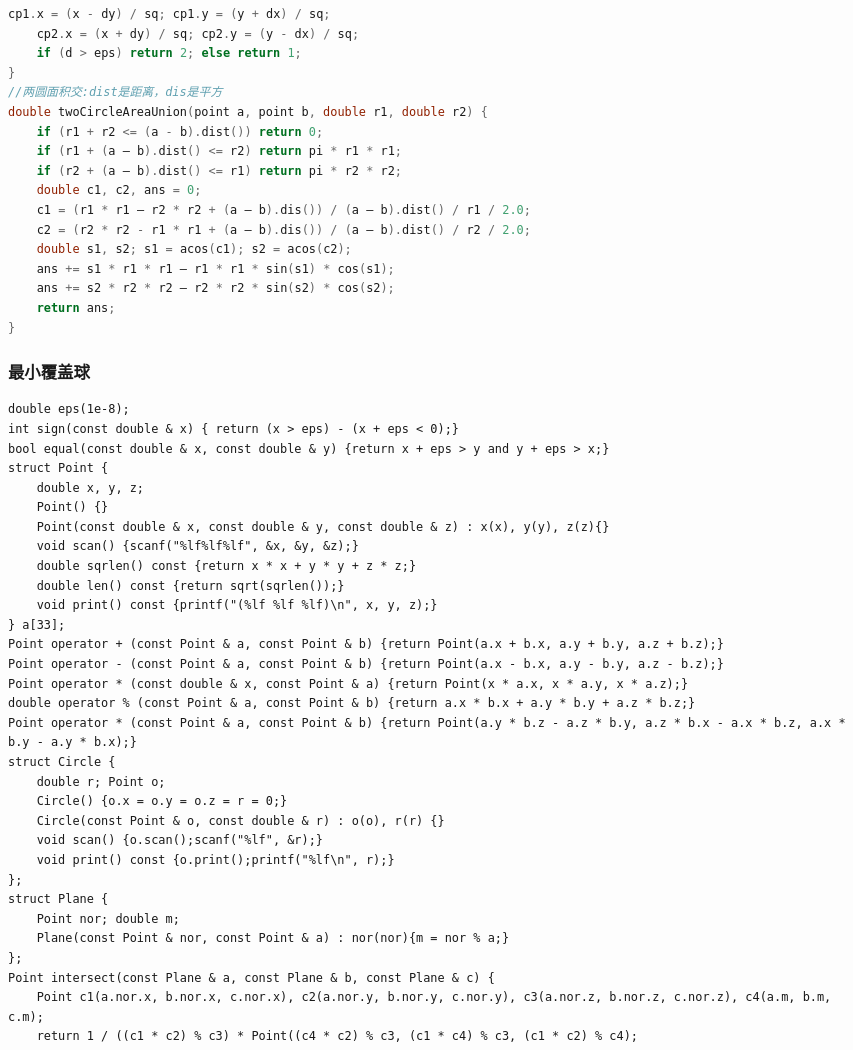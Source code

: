 \documentclass[landscape,a4paper]{article}
\begin{document}
\begin{spacing}{0.3}
\begin{multicols}{2}
\begin{lstlisting}[language=C++]
	cp1.x = (x - dy) / sq; cp1.y = (y + dx) / sq;
	cp2.x = (x + dy) / sq; cp2.y = (y - dx) / sq;
	if (d > eps) return 2; else return 1;
}
//两圆面积交:dist是距离，dis是平方
double twoCircleAreaUnion(point a, point b, double r1, double r2) {
	if (r1 + r2 <= (a - b).dist()) return 0;
	if (r1 + (a – b).dist() <= r2) return pi * r1 * r1;
	if (r2 + (a – b).dist() <= r1) return pi * r2 * r2;
	double c1, c2, ans = 0;
	c1 = (r1 * r1 – r2 * r2 + (a – b).dis()) / (a – b).dist() / r1 / 2.0;
	c2 = (r2 * r2 - r1 * r1 + (a – b).dis()) / (a – b).dist() / r2 / 2.0;
	double s1, s2; s1 = acos(c1); s2 = acos(c2);
	ans += s1 * r1 * r1 – r1 * r1 * sin(s1) * cos(s1);
	ans += s2 * r2 * r2 – r2 * r2 * sin(s2) * cos(s2);
	return ans;
}
\end{lstlisting}
\subsubsection{最小覆盖球}
\begin{lstlisting}
double eps(1e-8);
int sign(const double & x) { return (x > eps) - (x + eps < 0);}
bool equal(const double & x, const double & y) {return x + eps > y and y + eps > x;}
struct Point {
	double x, y, z;
	Point() {}
	Point(const double & x, const double & y, const double & z) : x(x), y(y), z(z){}
	void scan() {scanf("%lf%lf%lf", &x, &y, &z);}
	double sqrlen() const {return x * x + y * y + z * z;}
	double len() const {return sqrt(sqrlen());}
	void print() const {printf("(%lf %lf %lf)\n", x, y, z);}
} a[33];
Point operator + (const Point & a, const Point & b) {return Point(a.x + b.x, a.y + b.y, a.z + b.z);}
Point operator - (const Point & a, const Point & b) {return Point(a.x - b.x, a.y - b.y, a.z - b.z);}
Point operator * (const double & x, const Point & a) {return Point(x * a.x, x * a.y, x * a.z);}
double operator % (const Point & a, const Point & b) {return a.x * b.x + a.y * b.y + a.z * b.z;}
Point operator * (const Point & a, const Point & b) {return Point(a.y * b.z - a.z * b.y, a.z * b.x - a.x * b.z, a.x * b.y - a.y * b.x);}
struct Circle {
	double r; Point o;
	Circle() {o.x = o.y = o.z = r = 0;}
	Circle(const Point & o, const double & r) : o(o), r(r) {}
	void scan() {o.scan();scanf("%lf", &r);}
	void print() const {o.print();printf("%lf\n", r);}
};
struct Plane {
	Point nor; double m;
	Plane(const Point & nor, const Point & a) : nor(nor){m = nor % a;}
};
Point intersect(const Plane & a, const Plane & b, const Plane & c) {
	Point c1(a.nor.x, b.nor.x, c.nor.x), c2(a.nor.y, b.nor.y, c.nor.y), c3(a.nor.z, b.nor.z, c.nor.z), c4(a.m, b.m, c.m);
	return 1 / ((c1 * c2) % c3) * Point((c4 * c2) % c3, (c1 * c4) % c3, (c1 * c2) % c4);

\end{lstlisting}
\end{multicols}
\end{spacing}
\end{document}

